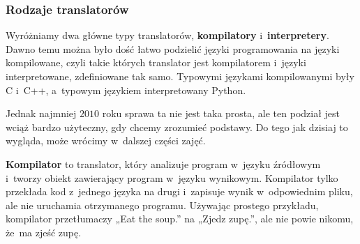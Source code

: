 \documentclass[10pt,t]{beamer}
\begin{document}
\begin{frame}
  \frametitle{Rodzaje translatorów}


  Wyróżniamy dwa główne typy translatorów, \textbf{kompilatory}
  i~\textbf{interpretery}. Dawno temu można było dość łatwo podzielić
  języki programowania na języki kompilowane, czyli takie których translator
  jest kompilatorem i~języki interpretowane, zdefiniowane tak samo.
  Typowymi językami kompilowanymi były C i~C++, a~typowym językiem
  interpretowany Python.

  Jednak najmniej $2010$ roku sprawa ta nie jest taka prosta, ale ten
  podział jest wciąż bardzo użyteczny, gdy chcemy zrozumieć podstawy. Do
  tego jak dzisiaj to wygląda, może wrócimy w~dalszej części zajęć.

  \textbf{Kompilator} to translator, który analizuje program w~języku
  źródłowym i~tworzy obiekt zawierający program w~języku wynikowym.
  Kompilator \alert{tylko} przekłada kod z~jednego języka na drugi
  i~zapisuje wynik w~odpowiednim pliku, ale \alert{nie} uruchamia
  otrzymanego programu. Używając prostego przykładu, kompilator
  przetłumaczy „Eat the soup.” na „Zjedz zupę.”, ale nie powie nikomu,
  że~ma zjeść zupę.

\end{frame}
\end{document}
